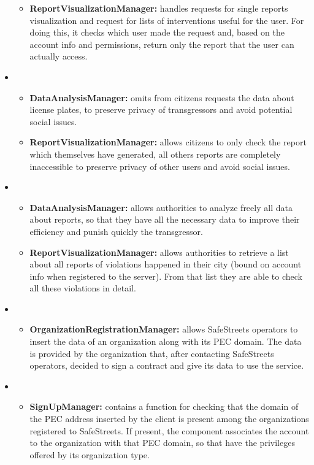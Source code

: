\begin{itemize}[label={}]
\begin{itemize}
		\item \textbf{ReportVisualizationManager:} handles requests for single reports visualization and request for lists of interventions useful for the user. For doing this, it checks which user made the request and, based on the account info and permissions, return only the report that the user can actually access. 
	\end{itemize}
	\item {}
	\begin{itemize}
		\item \textbf{DataAnalysisManager:} omits from citizens requests the data about license plates, to preserve privacy of transgressors and avoid potential social issues. 
		\item \textbf{ReportVisualizationManager:} allows citizens to only check the report which themselves have generated, all others reports are completely inaccessible to preserve privacy of other users and avoid social issues. 
	\end{itemize}
	\item {}
	\begin{itemize}
		\item \textbf{DataAnalysisManager:} allows authorities to analyze freely all data about reports, so that they have all the necessary data to improve their efficiency and punish quickly the transgressor.
		\item \textbf{ReportVisualizationManager:} allows authorities to retrieve a list about all reports of violations happened in their city (bound on account info when registered to the server). From that list they are able to check all these violations in detail. 
	\end{itemize}
	\item {}
	\begin{itemize}
		\item \textbf{OrganizationRegistrationManager:} allows SafeStreets operators to insert the data of an organization along with its PEC domain. The data is provided by the organization that, after contacting SafeStreets operators, decided to sign a contract and give its data to use the service.
	\end{itemize}
	\item {}
	\begin{itemize}
		\item \textbf{SignUpManager:} contains a function for checking that the domain of the PEC address inserted by the client is present among the organizations registered to SafeStreets. If present, the component associates the account to the organization with that PEC domain, so that have the privileges offered by its organization type.

\end{itemize}
\end{itemize}

